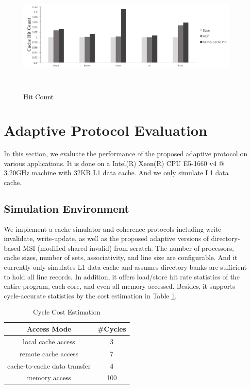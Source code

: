 \documentclass[conference]{IEEEtran}
\begin{document}
\begin{figure}[!h]
\centering
\captionsetup{justification=centering}
\includegraphics[width=7.5in,height=2.3in]{hit_count.png}
\caption{Hit Count}
\label{hit_count}
\end{figure}
\FloatBarrier


\newpage
\null\newpage

\section{Adaptive Protocol Evaluation}
In this section, we evaluate the performance of the proposed adaptive protocol on various applications. It is done on a Intel(R) Xeon(R) CPU E5-1660 v4 @ 3.20GHz machine with 32KB L1 data cache. And we only simulate L1 data cache.

\subsection{Simulation Environment}
We implement a cache simulator and coherence protocols including write-invalidate, write-update, as well as the proposed adaptive versions of directory-based MSI (modified-shared-invalid) from scratch. The number of processors, cache sizes, number of sets, associativity, and line size are configurable. And it currently only simulates L1 data cache and assumes directory banks are sufficient to hold all line records. In addition, it offers load/store hit rate statistics of the entire program, each core, and even all memory accessed. Besides, it supports cycle-accurate statistics by the cost estimation in Table \ref{cost_estimation}.

\begin{table}[!h]
\renewcommand{\arraystretch}{2.5}
\caption{Cycle Cost Estimation}
\label{cost_estimation}
\centering
\begin{tabular}{|c|c|}
\hline
Access Mode & \#Cycles\\
\hline
local cache access & 3\\
\hline
remote cache access & 7\\
\hline
cache-to-cache data transfer & 4\\
\hline
memory access & 100\\
\hline
\end{tabular}
\end{table}
\FloatBarrier
\end{document}
